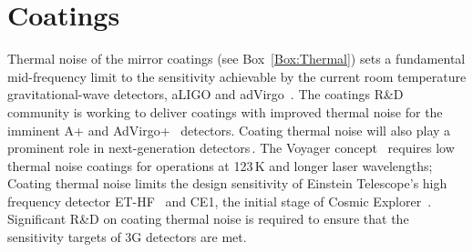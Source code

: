 \chapter{Coatings}
\label{sec:Coatings}




Thermal noise of the mirror coatings (see Box~\ref{Box:Thermal}) sets a fundamental mid-frequency limit to the sensitivity achievable by the current room temperature gravitational-wave detectors, aLIGO and adVirgo~\cite{AdvancedVirgo2015, AdvancedLIGO2015}. The coatings R\&D community is working to deliver coatings with improved thermal noise for the imminent A+ and AdVirgo+~\cite{Zucker:LIGOAplus, Cagnoli:VirgoAplus} detectors. 
Coating thermal noise will also play a prominent role in next-generation detectors\,\cite{DawnIV2018}. The Voyager concept~\cite{VoyagerDCC2018} requires low thermal noise coatings for operations at 123\,K and longer laser wavelengths; Coating thermal noise limits the design sensitivity of Einstein Telescope's high frequency detector ET-HF~\cite{ET2011} and CE1, the initial stage of Cosmic Explorer~\cite{CosmicExplorer2017}. Significant R\&D on coating thermal noise is required to ensure that the sensitivity targets of 3G detectors are met. 


